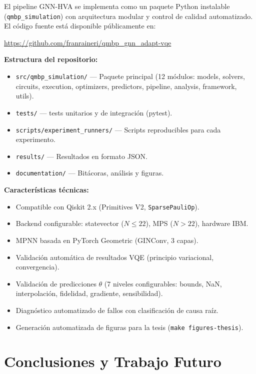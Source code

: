 \documentclass[11pt,a4paper,spanish]{book}
\begin{document}
El pipeline GNN-HVA se implementa como un paquete Python instalable (\texttt{qmbp\_simulation}) con arquitectura modular y control de calidad automatizado. El código fuente está disponible públicamente en:

\begin{center}
\url{https://github.com/franraineri/qmbp_gnn_adapt-vqe}
\end{center}

\textbf{Estructura del repositorio:}
\begin{itemize}
    \item \texttt{src/qmbp\_simulation/} --- Paquete principal (12 módulos: models, solvers, circuits, execution, optimizers, predictors, pipeline, analysis, framework, utils).
    \item \texttt{tests/} --- tests unitarios y de integración (pytest).
    \item \texttt{scripts/experiment\_runners/} --- Scripts reproducibles para cada experimento.
    \item \texttt{results/} --- Resultados en formato JSON.
    \item \texttt{documentation/} --- Bitácoras, análisis y figuras.
\end{itemize}

\textbf{Características técnicas:}
\begin{itemize}
    \item Compatible con Qiskit 2.x (Primitives V2, \texttt{SparsePauliOp}).
    \item Backend configurable: statevector ($N \leq 22$), MPS ($N > 22$), hardware IBM.
    \item MPNN basada en PyTorch Geometric \citep{fey2019} (GINConv, 3 capas).
    \item Validación automática de resultados VQE (principio variacional, convergencia).
    \item Validación de predicciones $\theta$ (7 niveles configurables: bounds, NaN, interpolación, fidelidad, gradiente, sensibilidad).
    \item Diagnóstico automatizado de fallos con clasificación de causa raíz.
    \item Generación automatizada de figuras para la tesis (\texttt{make figures-thesis}).
\end{itemize}



\chapter{Conclusiones y Trabajo Futuro}
\end{document}
